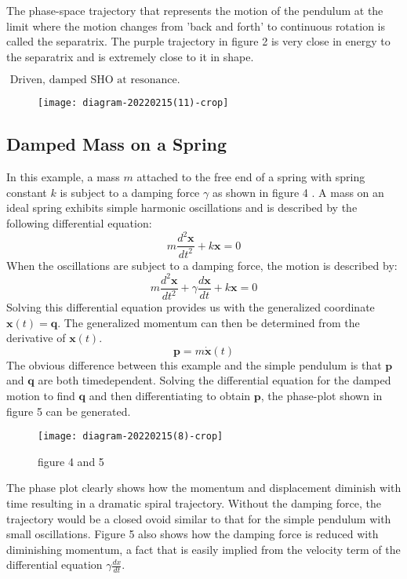 The phase-space trajectory that represents the motion of the pendulum at the limit where the motion changes from 'back and forth' to continuous rotation is called the separatrix. The purple trajectory in figure 2 is very close in energy to the separatrix and is extremely close to it in shape.\\
\begin{note}
	$\text { Driven, damped SHO at resonance. }$\\
	\begin{figure}[H]
		\centering
		\texttt{[image: diagram-20220215(11)-crop]}
		\caption{}
		\label{}
	\end{figure}
\end{note}
\subsection{Damped Mass on a Spring}
In this example, a mass $m$ attached to the free end of a spring with spring constant $k$ is subject to a damping force $\gamma$ as shown in figure 4 . A mass on an ideal spring exhibits simple harmonic oscillations and is described by the following differential equation:
$$
m \frac{d^{2} \boldsymbol{x}}{d t^{2}}+k \boldsymbol{x}=0
$$
When the oscillations are subject to a damping force, the motion is described by:
$$
m \frac{d^{2} \boldsymbol{x}}{d t^{2}}+\gamma \frac{d \boldsymbol{x}}{d t}+k \boldsymbol{x}=0
$$
Solving this differential equation provides us with the generalized coordinate $\boldsymbol{x}(t)=\boldsymbol{q}$. The generalized momentum can then be determined from the derivative of $\boldsymbol{x}(t)$.\\
$$
\boldsymbol{p}=m \dot{\boldsymbol{x}}(t)
$$
The obvious difference between this example and the simple pendulum is that $\boldsymbol{p}$ and $\boldsymbol{q}$ are both timedependent.
Solving the differential equation for the damped motion to find $\boldsymbol{q}$ and then differentiating to obtain $\boldsymbol{p}$, the phase-plot shown in figure 5 can be generated.\\
\begin{figure}[H]
	\centering
	\texttt{[image: diagram-20220215(8)-crop]}
	\caption{figure 4 and 5}
	\label{}
\end{figure}
The phase plot clearly shows how the momentum and displacement diminish with time resulting in a dramatic spiral trajectory. Without the damping force, the trajectory would be a closed ovoid similar to that for the simple pendulum with small oscillations. Figure 5 also shows how the damping force is reduced with diminishing momentum, a fact that is easily implied from the velocity term of the differential equation $\gamma \frac{d x}{d t}$.
